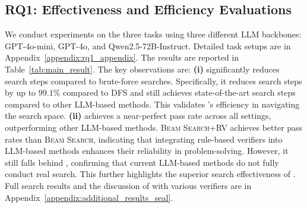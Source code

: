 \subsection{RQ1: Effectiveness and Efficiency Evaluations}
\label{sec:rq1}
We conduct experiments on the three tasks using three different LLM backbones: GPT-4o-mini, GPT-4o, and Qwen2.5-72B-Instruct. Detailed task setups are in Appendix~\ref{appendix:rq1_appendix}. The results are reported in Table~\ref{tab:main_result}. The key observations are:
\textbf{(i)} \method significantly reduces search steps compared to brute-force searches. Specifically, it reduces search steps by up to $99.1\%$ compared to \textsc{DFS} and still achieves state-of-the-art search steps compared to other LLM-based methods. This validates \method's efficiency in navigating the search space.
\textbf{(ii)} \method achieves a near-perfect pass rate across all settings, outperforming other LLM-based methods.
\textsc{Beam Search+RV} achieves better pass rates than \textsc{Beam Search}, indicating that integrating rule-based verifiers into LLM-based methods enhances their reliability in problem-solving. However, it still falls behind \method, confirming that current LLM-based methods do not fully conduct real search. This further highlights the superior search effectiveness of \method.
Full search results and the discussion of \method with various verifiers are in Appendix~\ref{appendix:additional_results_seal}.




